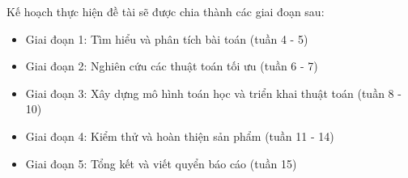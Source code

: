 Kế hoạch thực hiện đề tài sẽ được chia thành các giai đoạn sau:
\begin{itemize} 
    \item Giai đoạn 1: Tìm hiểu và phân tích bài toán (tuần 4 - 5) 
    
    \item Giai đoạn 2: Nghiên cứu các thuật toán tối ưu (tuần 6 - 7) 
    
    \item Giai đoạn 3: Xây dựng mô hình toán học và triển khai thuật toán (tuần 8 - 10) 
    
    \item Giai đoạn 4: Kiểm thử và hoàn thiện sản phẩm (tuần 11 - 14) 
    
    \item Giai đoạn 5: Tổng kết và viết quyển báo cáo (tuần 15) 
\end{itemize}